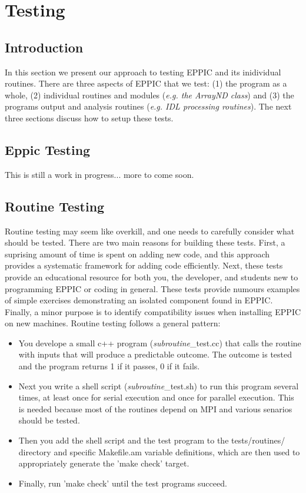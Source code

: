 

\chapter{Testing}\label{c:testing}

\section{Introduction}

In this section we present our approach to testing EPPIC and its inidividual
routines. There are three aspects of EPPIC that we test: (1) the
program as a whole, (2) individual routines and modules
(\emph{e.g. the ArrayND class}) and (3) the programs output and
analysis routines (\emph{e.g. IDL processing routines}). The next
three sections discuss how to setup these tests.

\section{Eppic Testing}

This is still a work in progress... more to come soon. 

\section{Routine Testing}

Routine testing may seem like overkill, and one needs to carefully
consider what should be tested. There are two main reasons for
building these tests. First, a suprising amount of time is spent on
adding new code, and this approach provides a systematic framework for
adding code efficiently. Next, these tests provide an educational
resource for both you, the developer, and students new to programming
EPPIC or coding in general. These tests provide numours examples of
simple exercises demonstrating an isolated component found in
EPPIC. Finally, a minor purpose is to identify compatibility issues
when installing EPPIC on new machines. 
\newline
\noindent Routine testing follows a general pattern: 

\begin{itemize}
\item You develope a small c++ program 
  (\emph{subroutine}\_test.cc) that calls the routine with inputs
that will produce a predictable outcome. The outcome is tested and the
program returns 1 if it passes, 0 if it fails. 
\item Next you write a shell script (\emph{subroutine}\_test.sh) to run
  this program several times, at 
  least once for serial execution and once for parallel
  execution. This is needed because most of the routines depend on MPI
  and various senarios should be tested.
\item Then you add the shell script and the test program to the
  tests/routines/ directory and specific
  Makefile.am variable definitions, which are then used to
  appropriately generate the 'make check' target. 
\item Finally, run 'make check' until the test programs succeed. 
\end{itemize}

